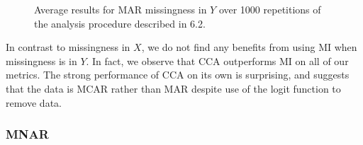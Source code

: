 \documentclass{article}
\begin{document}
\begin{figure}[H]
		\quad
		\caption{Average results for MAR missingness in $Y$ over 1000 repetitions of the analysis procedure described in 6.2.}
	\end{figure}
	
	In contrast to missingness in $X$, we do not find any benefits from using MI when missingness is in $Y$. In fact, we observe that CCA outperforms MI on all of our metrics. The strong performance of CCA on its own is surprising, and suggests that the data is MCAR rather than MAR despite use of the logit function to remove data.
	
	\subsubsection{MNAR}
\end{document}
